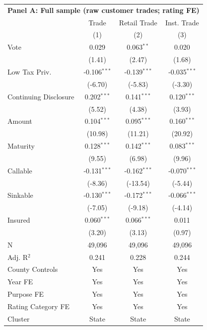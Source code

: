 \begingroup
\centering
\begin{tabular*}{\textwidth}{@{\extracolsep{\fill}}lccc}
\multicolumn{5}{l}{\textbf{Panel A: Full sample (raw customer trades; rating FE)}}\\

\addlinespace
   \toprule
                         & Trade          & Retail Trade   & Inst. Trade\\  
                         & (1)            & (2)            & (3)\\  
   \midrule 
   Vote                  & 0.029          & 0.063$^{**}$   & 0.020\\   
                         & (1.41)        & (2.47)        & (1.68)\\   
   Low Tax Priv.         & -0.106$^{***}$ & -0.139$^{***}$ & -0.035$^{***}$\\   
                         & (-6.70)       & (-5.83)       & (-3.30)\\   
   Continuing Disclosure & 0.202$^{***}$  & 0.141$^{***}$  & 0.120$^{***}$\\   
                         & (5.52)        & (4.38)        & (3.93)\\   
   Amount                & 0.104$^{***}$  & 0.095$^{***}$  & 0.160$^{***}$\\   
                         & (10.98)       & (11.21)       & (20.92)\\   
   Maturity              & 0.128$^{***}$  & 0.142$^{***}$  & 0.083$^{***}$\\   
                         & (9.55)        & (6.98)        & (9.96)\\   
   Callable              & -0.131$^{***}$ & -0.162$^{***}$ & -0.070$^{***}$\\   
                         & (-8.36)       & (-13.54)      & (-5.44)\\   
   Sinkable              & -0.130$^{***}$ & -0.172$^{***}$ & -0.066$^{***}$\\   
                         & (-7.05)       & (-9.18)       & (-4.14)\\   
   Insured               & 0.060$^{***}$  & 0.066$^{***}$  & 0.011\\   
                         & (3.20)        & (3.13)        & (0.97)\\   
   \hline
   N          & 49,096         & 49,096         & 49,096\\  
   Adj. R$^2$        & 0.241          & 0.228          & 0.244\\  
   County Controls       & Yes            & Yes            & Yes\\  
   Year FE               & Yes            & Yes            & Yes\\  
   Purpose FE            & Yes            & Yes            & Yes\\  
   Rating Category FE    & Yes            & Yes            & Yes\\  
   Cluster              & State & State & State\\  
   \bottomrule
\end{tabular*}
\par\endgroup
